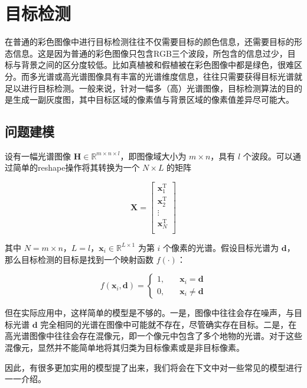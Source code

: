 \section{目标检测}

在普通的彩色图像中进行目标检测往往不仅需要目标的颜色信息，还需要目标的形态信息。这是因为普通的彩色图像只包含RGB三个波段，所包含的信息过少，目标与背景之间的区分度较低。比如真植被和假植被在彩色图像中都是绿色，很难区分。而多光谱或高光谱图像具有丰富的光谱维度信息，往往只需要获得目标光谱就足以进行目标检测。一般来说，针对一幅多（高）光谱图像，目标检测算法的目的是生成一副灰度图，其中目标区域的像素值与背景区域的像素值差异尽可能大。

\subsection{问题建模}

设有一幅光谱图像 \(\mathbf{H} \in \mathbb{R}^{m \times n \times l}\)，即图像域大小为 \(m\times n\)，具有 \(l\) 个波段。可以通过简单的reshape操作将其转换为一个 \(N \times L\) 的矩阵

\[
    \mathbf{X} = \begin{bmatrix}
        \bm{x}_{1}^{\mathrm{T}} \\
        \bm{x}_{2}^{\mathrm{T}} \\
        \vdots                  \\
        \bm{x}_{N}^{\mathrm{T}} \\
    \end{bmatrix}
\]

其中 \(N=m \times n\)，\(L=l\)，\(\bm{x}_{i} \in \mathbb{R}^{L \times 1}\) 为第 \(i\) 个像素的光谱。假设目标光谱为 \(\bm{d}\)，那么目标检测的目标是找到一个映射函数 \(f(\cdot)\)：

\[
    f(\bm{x}_{i}, \bm{d}) = \left\{
    \begin{aligned}
        1, & \quad \bm{x}_{i} = \bm{d}    \\
        0, & \quad \bm{x}_{i} \neq \bm{d}
    \end{aligned} \right.
\]

但在实际应用中，这样简单的模型是不够的。一是，图像中往往会存在噪声，与目标光谱 \(\bm{d}\) 完全相同的光谱在图像中可能就不存在，尽管确实存在目标。二是，在高光谱图像中往往会存在混像元，即一个像元中包含了多个地物的光谱。对于这些混像元，显然并不能简单地将其归类为目标像素或是非目标像素。

因此，有很多更加实用的模型提了出来，我们将会在下文中对一些常见的模型进行一一介绍。

